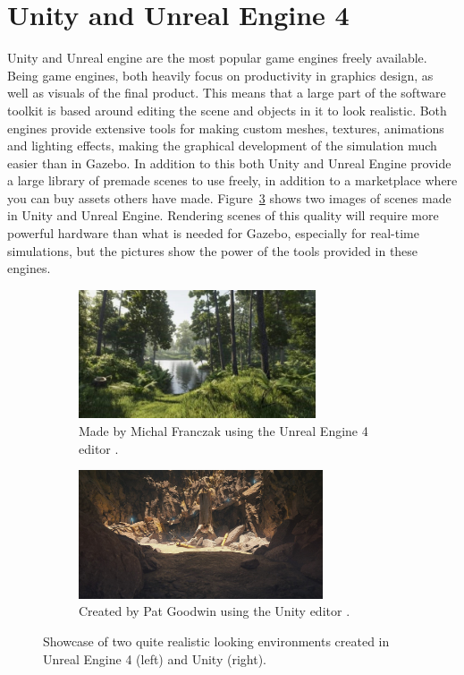 \section{Unity and Unreal Engine 4} \label{sec: UnityUnreal}

Unity and Unreal engine are the most popular game engines freely available. Being game engines, both heavily focus on productivity in graphics design, as well as visuals of the final product. This means that a large part of the software toolkit is based around editing the scene and objects in it to look realistic. Both engines provide extensive tools for making custom meshes, textures, animations and lighting effects, making the graphical development of the simulation much easier than in Gazebo. In addition to this both Unity and Unreal Engine provide a large library of premade scenes to use freely, in addition to a marketplace where you can buy assets others have made. Figure~\ref{fig:showcase_unityunreal} shows two images of scenes made in Unity and Unreal Engine. Rendering scenes of this quality will require more powerful hardware than what is needed for Gazebo, especially for real-time simulations, but the pictures show the power of the tools provided in these engines. 

\begin{figure}[!htb]
    \centering
    \begin{subfigure}{0.45\textwidth}
        \includegraphics[height=3.8cm]{rapport/fig/Simulator/unrealforest.jpg}
        \caption{Made by Michal Franczak using the Unreal Engine 4 editor \cite{Unrealshowcase}.}
        \label{fig:unreal_forest}
    \end{subfigure}
    \begin{subfigure}{0.45\textwidth}
        \includegraphics[height=3.8cm]{rapport/fig/Simulator/unitycave.jpg}
        \caption{Created by Pat Goodwin using the Unity editor \cite{Unityshowcase}.}
        \label{fig:Unity_cave}
    \end{subfigure}
    \caption{Showcase of two quite realistic looking environments created in Unreal Engine 4 (left) and Unity (right).}
    \label{fig:showcase_unityunreal}
\end{figure}

